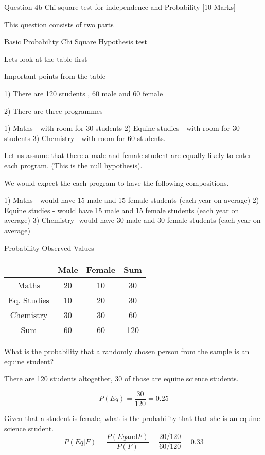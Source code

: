 \documentclass[]{report}
\begin{document}
			
			Question 4b  
			Chi-square test for independence and Probability [10 Marks]
			
			This question consists of two parts
			
			Basic Probability
			Chi Square Hypothesis test
			
			Lets look at the table first
			
			Important points from the table
			
			1) There are 120 students , 60 male and 60 female
			
			2) There are three programmes
			
			1) Maths - with room for 30 students
			2) Equine studies - with room for 30 students
			3) Chemistry - with room for 60 students.
			
			Let us assume that there a male and female student are equally likely to enter each program. (This is the null hypothesis).
			
			We would expect the each program to have the following compositions.
			
			1) Maths - would have 15 male and 15 female students (each year on average)
			2) Equine studies - would have 15 male and 15 female students (each year on average)
			3) Chemistry -would have 30 male and 30 female students (each year on average)
			
			
			Probability
			Observed Values


\begin{center}
	\begin{tabular}{cccc}
	&	Male	&	Female	&	Sum	\\ \hline
	Maths	&	20	&	10	&	30	\\ \hline
	Eq. Studies	&	10	&	20	&	30	\\ \hline
	Chemistry	&	30	&	30	&	60	\\ \hline
	Sum	&	60	&	60	&	120	\\ \hline

	\end{tabular}
\end{center}
			
			

			
			What is the probability that a randomly chosen person from the sample is an equine student?
			
			There are 120 students altogether, 30 of those are equine science students.
			
			\[P(Eq) = \frac{30}{120}= 0.25\]
			
			Given that a student is female, what is the probability that that she is an equine science student.
			\[P(Eq |F) = \frac{P(Eq \mbox{and} F)}{P(F)}= \frac{20/120}{60/120}= 0.33\]


			
			
\end{document}
